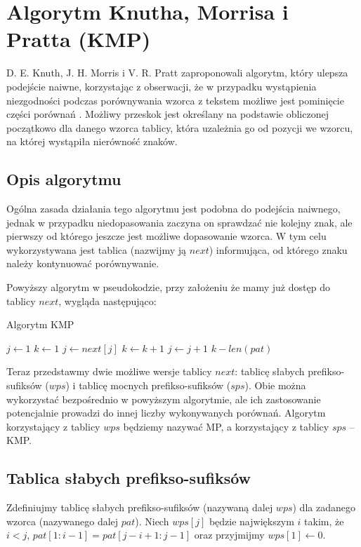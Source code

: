 \newpage
\section{Algorytm Knutha, Morrisa i Pratta (KMP)}
D. E. Knuth, J. H. Morris i V. R. Pratt zaproponowali algorytm, który ulepsza podejście naiwne, korzystając z obserwacji, że w przypadku wystąpienia niezgodności podczas porównywania wzorca z tekstem możliwe jest pominięcie części porównań \cite{KMP}. Możliwy przeskok jest określany na podstawie obliczonej początkowo dla danego wzorca tablicy, która uzależnia go od pozycji we wzorcu, na której wystąpiła nierówność znaków.

\subsection{Opis algorytmu}
Ogólna zasada działania tego algorytmu jest podobna do podejścia naiwnego, jednak w przypadku niedopasowania zaczyna on sprawdzać nie kolejny znak, ale pierwszy od którego jeszcze jest możliwe dopasowanie wzorca. W tym celu wykorzystywana jest tablica (nazwijmy ją $next$) informująca, od którego znaku należy kontynuować porównywanie.

\noindent
Powyższy algorytm w pseudokodzie, przy założeniu że mamy już dostęp do tablicy $next$, wygląda następująco:
\begin{algorithm}
\caption{Algorytm KMP}\label{alg:kmp}
\begin{algorithmic}[1]
\State $j \gets 1$
\State $k \gets 1$
        \State $j \gets next[j]$
    \EndWhile
    \State $k \gets k + 1$
    \State $j \gets j + 1$
        \State \Return $k - len(pat)$
    \EndIf
\EndWhile
\end{algorithmic}
\end{algorithm}

Teraz przedstawmy dwie możliwe wersje tablicy $next$: tablicę słabych prefikso-sufiksów ($wps$) i tablicę mocnych prefikso-sufiksów ($sps$). Obie można wykorzystać bezpośrednio w powyższym algorytmie, ale ich zastosowanie potencjalnie prowadzi do innej liczby wykonywanych porównań. Algorytm korzystający z tablicy $wps$ będziemy nazywać MP, a korzystający z tablicy $sps$ -- KMP.

\subsection*{Tablica słabych prefikso-sufiksów}
Zdefiniujmy tablicę słabych prefikso-sufiksów (nazywaną dalej $wps$) dla zadanego wzorca (nazywanego dalej $pat$). Niech $wps[j]$ będzie największym $i$ takim, że $i < j$, $pat[1:i-1] = pat[j-i+1:j-1]$ oraz przyjmijmy $wps[1] \gets 0$.

